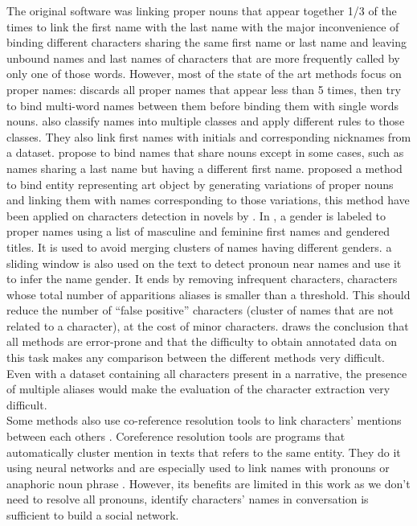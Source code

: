 \documentclass[a4paper, 12pt]{report}
\begin{document}
The original software \citep{original} was linking proper nouns that appear together 1/3 of the times to link the first name with the last name with the major inconvenience of binding different characters sharing the same first name or last name and leaving unbound names and last names of characters that are more frequently called by only one of those words.
However, most of the state of the art methods focus on proper names:
\cite{delete5} discards all proper names that appear less than 5 times, then try to bind multi-word names between them before binding them with single words nouns.
\cite{structure_clustering} also classify names into multiple classes and apply different rules to those classes.
They also link first names with initials and corresponding nicknames from a dataset.
\cite{character_meta} propose to bind names that share nouns except in some cases, such as names sharing a last name but having a different first name.
\cite{variation} proposed a method to bind entity representing art object by generating variations of proper nouns and linking them with names corresponding to those variations,
this method have been applied on characters detection in novels by \cite{quoted, character_meta}.
In \cite{delete5, structure_clustering, quoted}, a gender is labeled to proper names using a list of masculine and feminine first names and gendered titles.
It is used to avoid merging clusters of names having different genders.
\cite{ structure_clustering} a sliding window is also used on the text to detect pronoun near names and use it to infer the name gender.
It ends by removing infrequent characters, characters whose total number of apparitions aliases is smaller than a threshold.
This should reduce the number of ``false positive'' characters (cluster of names that are not related to a character), at the cost of minor characters.
\cite{delete5} draws the conclusion that all methods are error-prone and that the difficulty to obtain annotated data on this task makes any comparison
between the different methods very difficult.
Even with a dataset containing all characters present in a narrative, the presence of multiple aliases would make the evaluation of the character extraction very difficult.\\

Some methods also use co-reference resolution tools to link characters' mentions between each others \citep{character_meta}.
Coreference resolution tools are programs that automatically cluster mention in texts that refers to the same entity.
They do it using neural networks and are especially used to link names with pronouns or anaphoric noun phrase \citep{coref_deep, coref_deep2}.
However, its benefits are limited in this work as we don't need to resolve all pronouns, identify characters' names in conversation is sufficient to build a social network.\\
\end{document}
